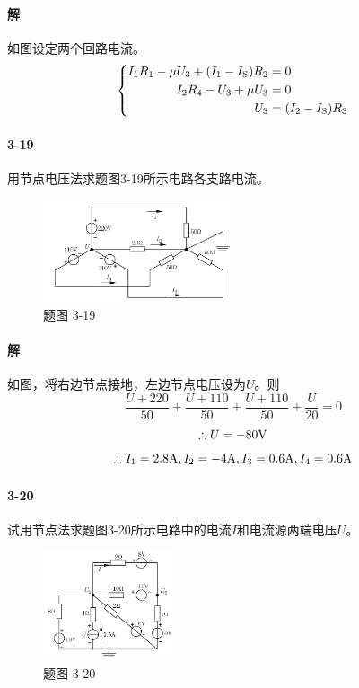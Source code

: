 \documentclass[hyperref, UTF8]{ctexart}
\newcommand{\volt}{{\rm V}}
\newcommand{\source}{{\rm S}}
\newcommand{\ampere}{{\rm A}}
\begin{document}
\paragraph{解}如图设定两个回路电流。
\begin{gather*}
    \left\{ \begin{aligned}
    I_1R_1-\mu U_3+(I_1-I_\source)R_2 & = 0 \\
    I_2R_4-U_3+\mu U_3 &= 0 \\
    U_3 &= (I_2-I_\source)R_3
    \end{aligned} \right.
\end{gather*}

\paragraph{3-19}\label{3-19}
用节点电压法求题图3-19所示电路各支路电流。

\begin{figure}[!htb]
\centering
\includegraphics[width=0.503\textwidth]{p3-19.png}
\caption*{题图 3-19}
\end{figure}

\paragraph{解}
如图，将右边节点接地，左边节点电压设为$U$。则
$$\frac{U+220}{50}+\frac{U+110}{50}+\frac{U+110}{50}+\frac{U}{20}=0$$
$$\therefore U=-80\volt$$
$$\therefore I_1=2.8\ampere, I_2=-4\ampere, I_3=0.6\ampere, I_4=0.6\ampere$$

\paragraph{3-20}试用节点法求题图3-20所示电路中的电流$I$和电流源两端电压$U$。

\begin{figure}[!htb]
\centering
\includegraphics[width=0.344\textwidth]{p3-20.png}
\caption*{题图 3-20}
\end{figure}
\end{document}

